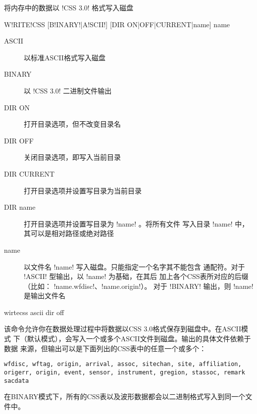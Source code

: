 \label{cmd:writecss}

将内存中的数据以 !CSS 3.0! 格式写入磁盘

\begin{SACSTX}
W!RITE!CSS [B!INARY!|A!SCII!] [DIR ON|OFF|CURRENT|name] name
\end{SACSTX}

\begin{description}
\item [ASCII] 以标准ASCII格式写入磁盘
\item [BINARY] 以 !CSS 3.0! 二进制文件输出
\item [DIR ON] 打开目录选项，但不改变目录名
\item [DIR OFF] 关闭目录选项，即写入当前目录
\item [DIR CURRENT] 打开目录选项并设置写目录为当前目录
\item [DIR name] 打开目录选项并设置写目录为 !name! 。将所有文件
    写入目录 !name! 中，其可以是相对路径或绝对路径
\item [name] 以文件名 !name! 写入磁盘。只能指定一个名字其不能包含
    通配符。对于 !ASCII! 型输出，以 !name! 为基础，在其后
    加上各个CSS表所对应的后缀（比如： !name.wfdisc!、!name.origin!）。
    对于 !BINARY! 输出，则 !name! 是输出文件名
\end{description}

\begin{SACDFT}
wirtecss ascii dir off
\end{SACDFT}

该命令允许你在数据处理过程中将数据以CSS 3.0格式保存到磁盘中。在ASCII模式
下（默认模式），会写入一个或多个ASCII文件到磁盘。输出的具体文件依赖于数据
来源，但输出可以是下面列出的CSS表中的任意一个或多个：
\begin{verbatim}
wfdisc, wftag, origin, arrival, assoc, sitechan, site, affiliation,
origerr, origin, event, sensor, instrument, gregion, stassoc, remark sacdata
\end{verbatim}

在BINARY模式下，所有的CSS表以及波形数据都会以二进制格式写入到同一个文件中。
